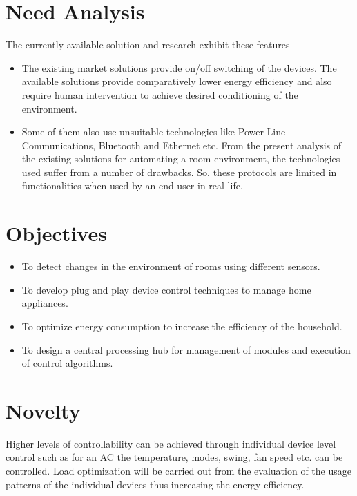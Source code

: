 \documentclass[12pt,a4paper,titlepage,twoside]{article}
\begin{document}
        \section{Need Analysis}
        The currently available solution and research exhibit these features
        \begin{itemize}
            \item The existing market solutions provide on/off switching of the devices. The available solutions provide comparatively lower energy efficiency and also require human intervention to achieve desired conditioning of the environment.
            \item Some of them also use unsuitable technologies like Power Line Communications, Bluetooth and Ethernet etc. From the present analysis of the existing solutions for automating a room environment, the technologies used suffer from a number of drawbacks. So, these protocols are limited in functionalities when used by an end user in real life.
        \end{itemize}
        
        \section{Objectives}
            \begin{itemize}
                \item To detect changes in the environment of rooms using different sensors.
                \item To develop plug and play device control techniques to manage home appliances.
                \item To optimize energy consumption to increase the efficiency of the household.
                \item To design a central processing hub for management of modules and execution of control algorithms.
            \end{itemize}
        
        \section{Novelty}
            Higher levels of controllability can be achieved through individual device level control such as for an AC the temperature, modes, swing, fan speed etc. can be controlled. Load optimization will be carried out from the evaluation of the usage patterns of the individual devices thus increasing the energy efficiency. 
        
\end{document}
